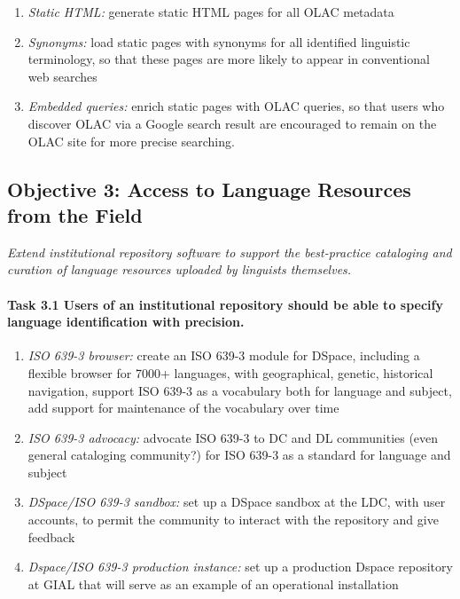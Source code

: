 \begin{enumerate}[label=\emph{\task\alph*}]
\item \emph{Static HTML:}
  generate static HTML pages for all OLAC metadata
\item \emph{Synonyms:}
  load static pages with synonyms for all identified linguistic
  terminology, so that these pages are more likely to appear in
  conventional web searches
\item \emph{Embedded queries:}
  enrich static pages with OLAC queries, so that users who discover
  OLAC via a Google search result are encouraged to remain on the
  OLAC site for more precise searching.
\end{enumerate}

\subsection*{Objective 3: Access to Language Resources from the Field}

\emph{Extend institutional repository software to support the best-practice
    cataloging and curation of language resources 
    uploaded by linguists themselves.}

\def\task{3.1}
\paragraph{Task {\task} Users of an institutional repository should be able
  to specify language identification with precision.}

\begin{enumerate}[label=\emph{\task\alph*}]
\item \emph{ISO 639-3 browser:}
  create an ISO 639-3 module for DSpace, including a flexible
  browser for 7000+ languages, with geographical, genetic, historical
  navigation, support ISO 639-3 as a vocabulary both for language and subject,
  add support for maintenance of the vocabulary over time
\item \emph{ISO 639-3 advocacy:}
  advocate ISO 639-3 to DC and DL communities (even general cataloging
  community?) for ISO 639-3 as a standard for language and subject
\item \emph{DSpace/ISO 639-3 sandbox:}
  set up a DSpace sandbox at the LDC, with user accounts,
  to permit the community to interact with the repository and give feedback
\item \emph{Dspace/ISO 639-3 production instance:}
  set up a production Dspace repository at GIAL that will serve
  as an example of an operational installation 
\end{enumerate}

